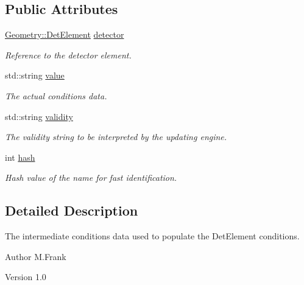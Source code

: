 \subsection*{Public Attributes}
\begin{DoxyCompactItemize}
\item 
\hyperlink{class_d_d4hep_1_1_geometry_1_1_det_element}{Geometry::DetElement} \hyperlink{class_d_d4hep_1_1_conditions_1_1_entry_ae10613b25e5bc54df7d4ada0a2b774a9}{detector}
\begin{DoxyCompactList}\small\item\em Reference to the detector element. \item\end{DoxyCompactList}\item 
std::string \hyperlink{class_d_d4hep_1_1_conditions_1_1_entry_a28dbb34f86ab05df22df9f9756100bcf}{value}
\begin{DoxyCompactList}\small\item\em The actual conditions data. \item\end{DoxyCompactList}\item 
std::string \hyperlink{class_d_d4hep_1_1_conditions_1_1_entry_a9a559618af3b8d15be51c806e40d1764}{validity}
\begin{DoxyCompactList}\small\item\em The validity string to be interpreted by the updating engine. \item\end{DoxyCompactList}\item 
int \hyperlink{class_d_d4hep_1_1_conditions_1_1_entry_a7f213cb001c089b5aa3ed890aa1f05b5}{hash}
\begin{DoxyCompactList}\small\item\em Hash value of the name for fast identification. \item\end{DoxyCompactList}\end{DoxyCompactItemize}


\subsection{Detailed Description}
The intermediate conditions data used to populate the DetElement conditions. \begin{DoxyAuthor}{Author}
M.Frank 
\end{DoxyAuthor}
\begin{DoxyVersion}{Version}
1.0 
\end{DoxyVersion}


